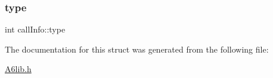\mbox{\label{structcall_info_a4f95adeb3a1bb04b2ba5cc5735e5e80a}} 
\subsubsection{\texorpdfstring{type}{type}}
{\footnotesize\ttfamily int call\+Info\+::type}



The documentation for this struct was generated from the following file\+:\begin{DoxyCompactItemize}
\item 
\mbox{\hyperlink{_a6lib_8h}{A6lib.\+h}}\end{DoxyCompactItemize}
